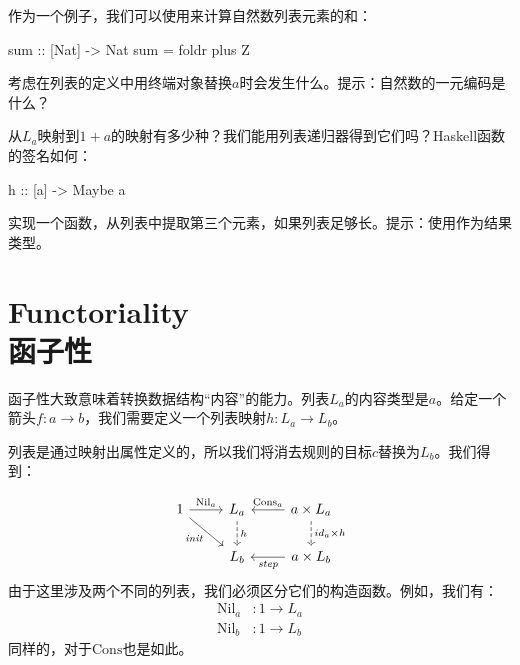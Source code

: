 \documentclass[DaoFP]{subfiles}
\begin{document}
    作为一个例子，我们可以使用来计算自然数列表元素的和：
    \begin{haskell}
        sum :: [Nat] -> Nat
        sum = foldr plus Z
    \end{haskell}


    \begin{exercise}
        考虑在列表的定义中用终端对象替换$a$时会发生什么。提示：自然数的一元编码是什么？
    \end{exercise}
    \begin{exercise}
        从$L_a$映射到$1 + a$的映射有多少种？我们能用列表递归器得到它们吗？Haskell函数的签名如何：
        \begin{haskell}
            h :: [a] -> Maybe a
        \end{haskell}
    \end{exercise}
    \begin{exercise}
        实现一个函数，从列表中提取第三个元素，如果列表足够长。提示：使用作为结果类型。
    \end{exercise}

    \section{Functoriality\\函子性}

    函子性大致意味着转换数据结构“内容”的能力。列表$L_a$的内容类型是$a$。给定一个箭头$f \colon a \to b$，我们需要定义一个列表映射$h \colon L_a \to L_b$。

    列表是通过映射出属性定义的，所以我们将消去规则的目标$c$替换为$L_b$。我们得到：

    \[
        \begin{tikzcd}
            1
            \arrow[r, "\text{Nil}_a"]
            \arrow[rd, "\mathit{init}"']
            &L_a
            \arrow[d, dashed, "h"]
            &a \times L_a
            \arrow[l, "\text{Cons}_a"']
            \arrow[d, dashed, "id_a \times h"]
            \\
            & L_b
            & a \times L_b
            \arrow[l, "\mathit{step}"]
        \end{tikzcd}
    \]
    由于这里涉及两个不同的列表，我们必须区分它们的构造函数。例如，我们有：
    \begin{align*}
        \text{Nil}_a &\colon 1 \to L_a \\
        \text{Nil}_b &\colon 1 \to L_b
    \end{align*}
    同样的，对于$\text{Cons}$也是如此。
\end{document}
